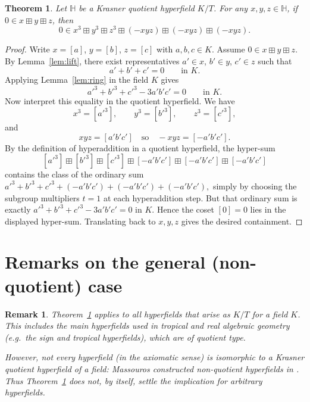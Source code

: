 \documentclass[11pt]{article}
\newtheorem{theorem}{Theorem}
\newtheorem{remark}{Remark}
\newcommand{\Hf}{\mathbb{H}}
\newcommand{\boxplusop}{\boxplus}
\begin{document}
\begin{theorem}\label{thm:quotientcase}
Let $\Hf$ be a Krasner quotient hyperfield $K/T$.
For any $x,y,z\in \Hf$, if $0\in x\boxplusop y\boxplusop z$, then
\[
0\in x^3\boxplusop y^3\boxplusop z^3\boxplusop (-xyz)\boxplusop (-xyz)\boxplusop (-xyz).
\]
\end{theorem}

\begin{proof}
Write $x=[a]$, $y=[b]$, $z=[c]$ with $a,b,c\in K$.
Assume $0\in x\boxplusop y\boxplusop z$.
By Lemma~\ref{lem:lift}, there exist representatives $a'\in x$, $b'\in y$, $c'\in z$
such that
\[
a'+b'+c'=0 \qquad\text{in }K.
\]
Applying Lemma~\ref{lem:ring} in the field $K$ gives
\[
a'^3 + b'^3 + c'^3 - 3a'b'c' = 0 \qquad\text{in }K.
\]
Now interpret this equality in the quotient hyperfield.
We have
\[
x^3 = [a'^3],\qquad y^3=[b'^3],\qquad z^3=[c'^3],
\]
and
\[
xyz = [a'b'c']\quad\text{so}\quad -xyz = [-a'b'c'].
\]
By the definition of hyperaddition in a quotient hyperfield, the hyper-sum
\[
[a'^3]\boxplusop [b'^3]\boxplusop [c'^3]\boxplusop [-a'b'c']\boxplusop[-a'b'c']\boxplusop[-a'b'c']
\]
contains the class of the ordinary sum
\(
a'^3+b'^3+c'^3+(-a'b'c')+(-a'b'c')+(-a'b'c'),
\)
simply by choosing the subgroup multipliers $t=1$ at each hyperaddition step.
But that ordinary sum is exactly $a'^3+b'^3+c'^3-3a'b'c'=0$ in $K$.
Hence the coset $[0]=0$ lies in the displayed hyper-sum.
Translating back to $x,y,z$ gives the desired containment.
\end{proof}

\section{Remarks on the general (non-quotient) case}

\begin{remark}
Theorem~\ref{thm:quotientcase} applies to all hyperfields that arise as $K/T$ for a field $K$.
This includes the main hyperfields used in tropical and real algebraic geometry (e.g.\ the sign and tropical hyperfields),
which are of quotient type.

However, not every hyperfield (in the axiomatic sense) is isomorphic to a Krasner quotient hyperfield of a field:
Massouros constructed non-quotient hyperfields in \cite{Massouros1985}.
Thus Theorem~\ref{thm:quotientcase} does not, by itself, settle the implication for arbitrary hyperfields.
\end{remark}
\end{document}
